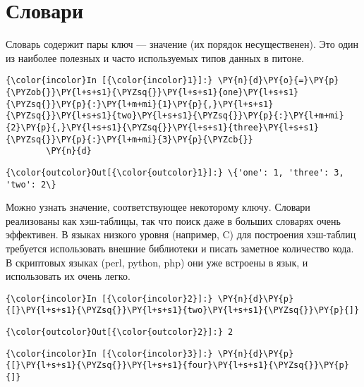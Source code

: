\section{Словари}
\label{S106}

Словарь содержит пары ключ --- значение (их порядок несущественен). Это
один из наиболее полезных и часто используемых типов данных в питоне.

    \begin{Verbatim}[commandchars=\\\{\}]
{\color{incolor}In [{\color{incolor}1}]:} \PY{n}{d}\PY{o}{=}\PY{p}{\PYZob{}}\PY{l+s+s1}{\PYZsq{}}\PY{l+s+s1}{one}\PY{l+s+s1}{\PYZsq{}}\PY{p}{:}\PY{l+m+mi}{1}\PY{p}{,}\PY{l+s+s1}{\PYZsq{}}\PY{l+s+s1}{two}\PY{l+s+s1}{\PYZsq{}}\PY{p}{:}\PY{l+m+mi}{2}\PY{p}{,}\PY{l+s+s1}{\PYZsq{}}\PY{l+s+s1}{three}\PY{l+s+s1}{\PYZsq{}}\PY{p}{:}\PY{l+m+mi}{3}\PY{p}{\PYZcb{}}
        \PY{n}{d}
\end{Verbatim}

            \begin{Verbatim}[commandchars=\\\{\}]
{\color{outcolor}Out[{\color{outcolor}1}]:} \{'one': 1, 'three': 3, 'two': 2\}
\end{Verbatim}
        
    Можно узнать значение, соответствующее некоторому ключу. Словари
реализованы как хэш-таблицы, так что поиск даже в больших словарях очень
эффективен. В языках низкого уровня (например, C) для построения
хэш-таблиц требуется использовать внешние библиотеки и писать заметное
количество кода. В скриптовых языках (perl, python, php) они уже
встроены в язык, и использовать их очень легко.

    \begin{Verbatim}[commandchars=\\\{\}]
{\color{incolor}In [{\color{incolor}2}]:} \PY{n}{d}\PY{p}{[}\PY{l+s+s1}{\PYZsq{}}\PY{l+s+s1}{two}\PY{l+s+s1}{\PYZsq{}}\PY{p}{]}
\end{Verbatim}

            \begin{Verbatim}[commandchars=\\\{\}]
{\color{outcolor}Out[{\color{outcolor}2}]:} 2
\end{Verbatim}
        
    \begin{Verbatim}[commandchars=\\\{\}]
{\color{incolor}In [{\color{incolor}3}]:} \PY{n}{d}\PY{p}{[}\PY{l+s+s1}{\PYZsq{}}\PY{l+s+s1}{four}\PY{l+s+s1}{\PYZsq{}}\PY{p}{]}
\end{Verbatim}

